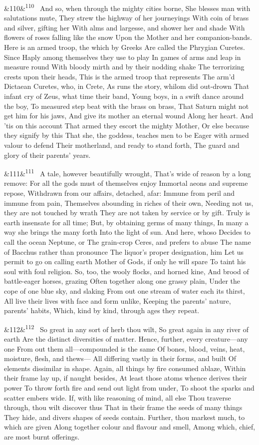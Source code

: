 \documentclass[12pt]{article}
\newcommand{\para}[1][]{\par\noindent\ifx&#1&\else\textsuperscript{\footnotesize #1}~\fi}
\begin{document}
\para[110] And so, when through the mighty cities borne, She blesses man with salutations mute, They strew the highway of her journeyings With coin of brass and silver, gifting her With alms and largesse, and shower her and shade With flowers of roses falling like the snow Upon the Mother and her companion-bands. Here is an armed troop, the which by Greeks Are called the Phrygian Curetes. Since Haply among themselves they use to play In games of arms and leap in measure round With bloody mirth and by their nodding shake The terrorizing crests upon their heads, This is the armed troop that represents The arm'd Dictaean Curetes, who, in Crete, As runs the story, whilom did out-drown That infant cry of Zeus, what time their band, Young boys, in a swift dance around the boy, To measured step beat with the brass on brass, That Saturn might not get him for his jaws, And give its mother an eternal wound Along her heart. And 'tis on this account That armed they escort the mighty Mother, Or else because they signify by this That she, the goddess, teaches men to be Eager with armed valour to defend Their motherland, and ready to stand forth, The guard and glory of their parents' years.

\para[111] A tale, however beautifully wrought, That's wide of reason by a long remove: For all the gods must of themselves enjoy Immortal aeons and supreme repose, Withdrawn from our affairs, detached, afar: Immune from peril and immune from pain, Themselves abounding in riches of their own, Needing not us, they are not touched by wrath They are not taken by service or by gift. Truly is earth insensate for all time; But, by obtaining germs of many things, In many a way she brings the many forth Into the light of sun. And here, whoso Decides to call the ocean Neptune, or The grain-crop Ceres, and prefers to abuse The name of Bacchus rather than pronounce The liquor's proper designation, him Let us permit to go on calling earth Mother of Gods, if only he will spare To taint his soul with foul religion. So, too, the wooly flocks, and horned kine, And brood of battle-eager horses, grazing Often together along one grassy plain, Under the cope of one blue sky, and slaking From out one stream of water each its thirst, All live their lives with face and form unlike, Keeping the parents' nature, parents' habits, Which, kind by kind, through ages they repeat.

\para[112] So great in any sort of herb thou wilt, So great again in any river of earth Are the distinct diversities of matter. Hence, further, every creature---any one From out them all---compounded is the same Of bones, blood, veins, heat, moisture, flesh, and thews--- All differing vastly in their forms, and built Of elements dissimilar in shape. Again, all things by fire consumed ablaze, Within their frame lay up, if naught besides, At least those atoms whence derives their power To throw forth fire and send out light from under, To shoot the sparks and scatter embers wide. If, with like reasoning of mind, all else Thou traverse through, thou wilt discover thus That in their frame the seeds of many things They hide, and divers shapes of seeds contain. Further, thou markest much, to which are given Along together colour and flavour and smell, Among which, chief, are most burnt offerings.
\end{document}
